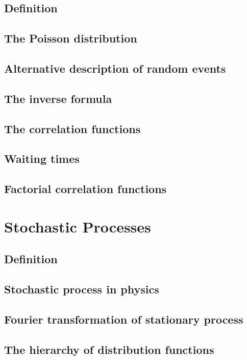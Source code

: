 \documentclass{book}
\numberwithin{equation}{section}
\theoremstyle{plain}
\theoremstyle{definition}
\theoremstyle{remark}
\begin{document}
\section{Definition}

\section{The Poisson distribution}

\section{Alternative description of random events}

\section{The inverse formula}

\section{The correlation functions}

\section{Waiting times}

\section{Factorial correlation functions}


\chapter{Stochastic Processes}

\section{Definition}

\section{Stochastic process in physics}

\section{Fourier transformation of stationary process}

\section{The hierarchy of distribution functions}
\end{document}
